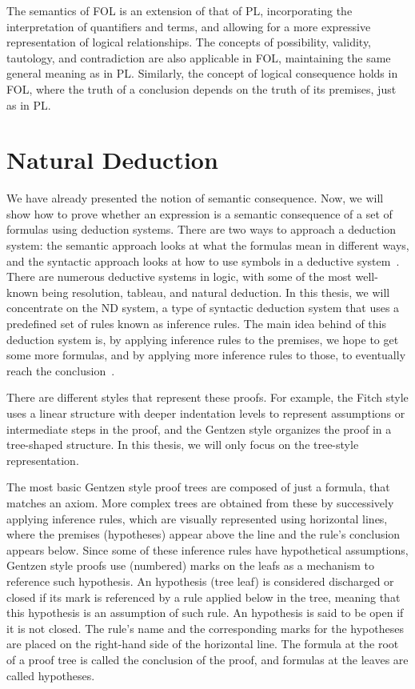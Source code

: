 The semantics of \gls{FOL} is an extension of that of \gls{PL}, incorporating the interpretation of quantifiers and terms, and allowing for a more expressive representation of logical relationships. The concepts of possibility, validity, tautology, and contradiction are also applicable in \gls{FOL}, maintaining the same general meaning as in \gls{PL}. Similarly, the concept of logical consequence holds in \gls{FOL}, where the truth of a conclusion depends on the truth of its premises, just as in \gls{PL}.

\section{Natural Deduction} 

\label{chap:prop-deduction}
We have already presented the notion of semantic consequence. Now, we will show how to prove whether an expression is a semantic consequence of a set of formulas using deduction systems. There are two ways to approach a deduction system: the semantic approach looks at what the formulas mean in different ways, and the syntactic approach looks at how to use symbols in a deductive system~\cite{gouveia_lgica}. There are numerous deductive systems in logic, with some of the most well-known being resolution, tableau, and natural deduction. In this thesis, we will concentrate on the \gls{ND} system, a type of syntactic deduction system that uses a predefined set of rules known as inference rules. The main idea behind of this deduction system is, by applying inference rules to the premises, we hope to get some more formulas, and by applying more inference rules to those, to eventually reach the conclusion~\cite{huth_2004_logic}.

There are different styles that represent these proofs. For example, the Fitch style uses a linear structure with deeper indentation levels to represent assumptions or intermediate steps in the proof, and the Gentzen style organizes the proof in a tree-shaped structure. In this thesis, we will only focus on the tree-style representation.

The most basic Gentzen style proof trees are composed of just a formula, that matches an axiom. More complex trees are obtained from these by successively applying inference rules, which are visually represented using horizontal lines, where the premises (hypotheses) appear above the line and the rule’s conclusion appears below. Since some of these inference rules have hypothetical assumptions, Gentzen style proofs use (numbered) marks on the leafs as a mechanism to reference such hypothesis. An hypothesis (tree leaf) is considered discharged or closed if its mark is referenced by a rule applied below in the tree, meaning that this hypothesis is an assumption of such rule. An hypothesis is said to be open if it is not closed. The rule’s name and the corresponding marks for the hypotheses are placed on the right-hand side of the horizontal line.
The formula at the root of a proof tree is called the conclusion of the proof, and formulas at the leaves are called hypotheses.   

